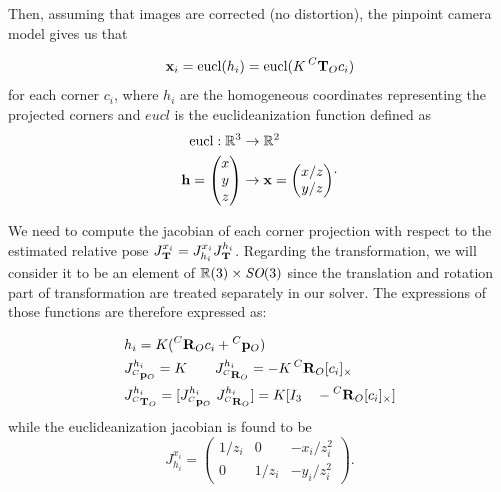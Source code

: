 Then, assuming that images are corrected (no distortion), the pinpoint camera model gives us that

\begin{equation}
    {\bf x}_i = \text{eucl}(h_i) = \text{eucl}(K\prescript{C}{}{{\bf T}}_{O} c_i)
\end{equation}
for each corner $c_i$, where $h_i$ are the homogeneous coordinates representing the projected corners and $eucl$ is the euclideanization function defined as
\begin{equation}
    \begin{split}
        \text{eucl}: \mathbb{R}^3 &\rightarrow \mathbb{R}^2 \\
        {\bf h} = \begin{pmatrix}x\\y\\z\end{pmatrix} &\rightarrow {\bf x} = \begin{pmatrix}x/z\\y/z\end{pmatrix}
    \end{split}.
\end{equation}

We need to compute the jacobian of each corner projection with respect to the estimated relative pose $J^{x_i}_{\prescript{}{}{{\bf T}}_{}} = J^{x_i}_{h_i} J^{h_i}_{\prescript{}{}{{\bf T}}_{}}$. 
Regarding the transformation, we will consider it to be an element of $\mathbb{R}(3)\times \textit{SO}(3)$ since the translation and rotation part 
of transformation are treated separately in our solver. The expressions of those functions are therefore expressed as:

\begin{equation}
    \begin{split}
        &h_i = K(\prescript{C}{}{{\bf R}}_{O}c_i + \prescript{C}{}{{\bf p}}_{O}) \\
        &J^{h_i}_{\prescript{C}{}{{\bf p}}_{O}} = K ~~~~~~ J^{h_i}_{\prescript{C}{}{{\bf R}}_{O}} = -K\prescript{C}{}{{\bf R}}_{O}[c_i]_{\times}  \\  
        &J^{h_i}_{\prescript{C}{}{{\bf T}}_{O}} = [J^{h_i}_{\prescript{C}{}{{\bf p}}_{O}} ~J^{h_i}_{\prescript{C}{}{{\bf R}}_{O}}] = K [I_3 ~~~ -\prescript{C}{}{{\bf R}}_{O} [c_i]_{\times}]
    \end{split}
\end{equation}
while the euclideanization jacobian is found to be
\begin{equation}
    J^{x_i}_{h_i}
    =
    \begin{pmatrix}
    1/z_i & 0 & -x_i/z_i^2 \\
    0 & 1/z_i & -y_i/z_i^2
    \end{pmatrix}.
\end{equation}


